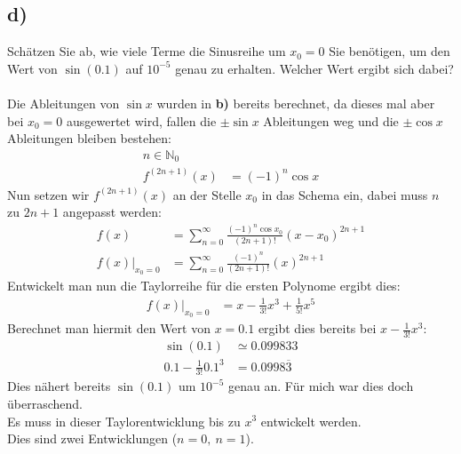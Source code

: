 \documentclass{theozettel}
\begin{document}
\subsection*{d)}Schätzen Sie ab, wie viele Terme die Sinusreihe um $x_0=0$ Sie benötigen, um den Wert von $\sin\left(0.1\right)$ auf $10^{-5}$ genau zu erhalten. Welcher Wert ergibt sich dabei?\\\\
Die Ableitungen von $\sin x$ wurden in \textbf{b)} bereits berechnet, da dieses mal aber bei $x_0=0$ ausgewertet wird, fallen die $\pm\sin x$ Ableitungen weg und die $\pm\cos x$ Ableitungen bleiben bestehen: 
\begin{align*}
n\in\mathbb{N}_0\\
f^{\left(2n+1\right)}\left(x\right)&=\left(-1\right)^n\cos x
\end{align*}
Nun setzen wir $f^{\left(2n+1\right)}\left(x\right)$ an der Stelle $x_0$ in das Schema ein, dabei muss $n$ zu $2n+1$ angepasst werden:
\begin{align*}
f\left(x\right)&=\sum_{n=0}^\infty \frac{\left(-1\right)^n\cos x_0}{\left(2n+1\right)!}\left(x-x_0\right)^{2n+1}\\
f\left(x\right)\big|_{x_0=0}&=\sum_{n=0}^\infty \frac{\left(-1\right)^n}{\left(2n+1\right)!}\left(x\right)^{2n+1}
\end{align*}
Entwickelt man nun die Taylorreihe für die ersten Polynome ergibt dies:
\begin{align*}
f\left(x\right)\big|_{x_0=0}&=x-\frac{1}{3!}x^3+\frac{1}{5!}x^5
\end{align*}
Berechnet man hiermit den Wert von $x=0.1$ ergibt dies bereits bei $x-\frac{1}{3!}x^3$:
\begin{align*}
\sin\left(0.1\right)&\simeq 0.099833\\
0.1-\frac{1}{3!}0.1^3&=0.0998\overline{3}
\end{align*}
Dies nähert bereits $\sin\left(0.1\right)$ um $10^{-5}$ genau an. Für mich war dies doch überraschend.\\
Es muss in dieser Taylorentwicklung bis zu $x^3$ entwickelt werden.\\
Dies sind zwei Entwicklungen ($n=0, \ n=1$).



\newpage
\end{document}
